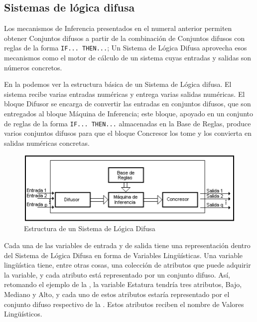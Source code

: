\subsection{Sistemas de lógica difusa}
Los mecanismos de Inferencia presentados en el numeral anterior permiten
obtener Conjuntos difusos a partir de la combinación de Conjuntos difusos
con reglas de la forma \texttt{IF... THEN...}; Un Sistema de Lógica Difusa aprovecha
esos mecanismos como el motor de cálculo de un sistema cuyas entradas y
salidas son números concretos.

En la  podemos ver la estructura básica de un Sistema de Lógica difusa.
El sistema recibe varias entradas numéricas y entrega varias salidas
numéricas. El bloque Difusor se encarga de convertir las entradas en
conjuntos difusos, que son entregados al bloque Máquina de Inferencia; este
bloque, apoyado en un conjunto de reglas de la forma \texttt{IF... THEN...}
almacenadas en la Base de Reglas, produce varios conjuntos difusos para
que el bloque Concresor los tome y los convierta en salidas numéricas
concretas.
\begin{figure}[H]
	\centering
	\includegraphics[scale=0.67]{images/sistemas_difusos.png}
	\caption{Estructura de un Sistema de Lógica Difusa}
	\label{fig:sistemas_difusos}
\end{figure}


Cada una de las variables de entrada y de salida tiene una representación
dentro del Sistema de Lógica Difusa en forma de Variables Lingüísticas. Una
variable lingüística tiene, entre otras cosas, una colección de atributos que
puede adquirir la variable, y cada atributo está representado por un conjunto
difuso. Así, retomando el ejemplo de la , la variable Estatura tendría
tres atributos, Bajo, Mediano y Alto, y cada uno de estos atributos estaría
representado por el conjunto difuso respectivo de la . Estos atributos
reciben el nombre de Valores Lingüísticos.